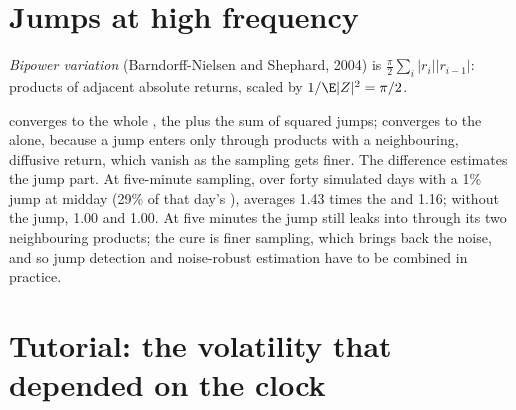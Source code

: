 \section{Jumps at high frequency}

\begin{definition}\label{def:qm:high-frequency-econometrics:bipower}
\emph{Bipower variation} (Barndorff-Nielsen and Shephard, 2004) is $\frac\pi2\sum_i|r_i||r_{i-1}|$: products of adjacent absolute returns, scaled by
$1/\E|Z|^2 = \pi/2$.
\end{definition}

 converges to the whole , the  plus the sum of squared jumps;  converges to the 
alone, because a jump enters only through products with a neighbouring, diffusive return, which vanish as the sampling gets finer. The difference estimates the jump part. At
five-minute sampling, over forty simulated days with a 1\% jump at midday (29\% of that day's ),  averages 1.43 times the  and  1.16; without the jump, 1.00 and 1.00. At five minutes the jump still leaks into  through its two neighbouring products; the
cure is finer sampling, which brings back the noise, and so jump detection and noise-robust estimation have to be combined in practice.

\section{Tutorial: the volatility that depended on the clock}\label{tut:qm:high-frequency-econometrics:clock}

